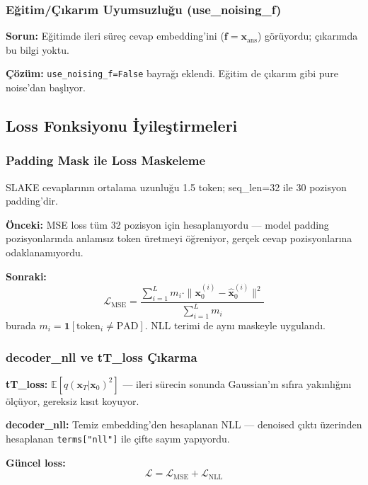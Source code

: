 \documentclass[12pt,a4paper]{article}
\begin{document}
\subsubsection{Eğitim/Çıkarım Uyumsuzluğu (use\_noising\_f)}

\textbf{Sorun:} Eğitimde ileri süreç cevap embedding'ini ($\mathbf{f} = \mathbf{x}_{\text{ans}}$) görüyordu; çıkarımda bu bilgi yoktu.

\textbf{Çözüm:} \texttt{use\_noising\_f=False} bayrağı eklendi. Eğitim de çıkarım gibi pure noise'dan başlıyor.

\subsection{Loss Fonksiyonu İyileştirmeleri}

\subsubsection{Padding Mask ile Loss Maskeleme}

SLAKE cevaplarının ortalama uzunluğu 1.5 token; seq\_len=32 ile 30 pozisyon padding'dir.

\textbf{Önceki:} MSE loss tüm 32 pozisyon için hesaplanıyordu --- model padding pozisyonlarında anlamsız token üretmeyi öğreniyor, gerçek cevap pozisyonlarına odaklanamıyordu.

\textbf{Sonraki:}
\begin{equation}
\mathcal{L}_{\text{MSE}} = \frac{\sum_{i=1}^{L} m_i \cdot \|\mathbf{x}_0^{(i)} - \hat{\mathbf{x}}_0^{(i)}\|^2}{\sum_{i=1}^{L} m_i}
\end{equation}
burada $m_i = \mathbf{1}[\text{token}_i \neq \text{PAD}]$. NLL terimi de aynı maskeyle uygulandı.

\subsubsection{decoder\_nll ve tT\_loss Çıkarma}

\textbf{tT\_loss:} $\mathbb{E}[q(\mathbf{x}_T|\mathbf{x}_0)^2]$ --- ileri sürecin sonunda Gaussian'ın sıfıra yakınlığını ölçüyor, gereksiz kısıt koyuyor.

\textbf{decoder\_nll:} Temiz embedding'den hesaplanan NLL --- denoised çıktı üzerinden hesaplanan \texttt{terms["nll"]} ile çifte sayım yapıyordu.

\textbf{Güncel loss:}
\begin{equation}
\mathcal{L} = \mathcal{L}_{\text{MSE}} + \mathcal{L}_{\text{NLL}}
\end{equation}
\end{document}
